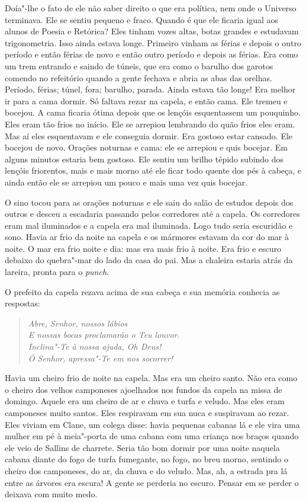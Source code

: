 Doía"-lhe o fato de ele não saber direito o que era política, nem onde o
Universo terminava. Ele se sentiu pequeno e fraco. Quando é que ele
ficaria igual aos alunos de Poesia e Retórica? Eles tinham vozes altas,
botas grandes e estudavam trigonometria. Isso ainda estava longe.
Primeiro vinham as férias e depois o outro período e então férias de
novo e então outro período e depois as férias. Era como um trem
entrando e saindo de túneis, que era como o barulho dos garotos comendo
no refeitório quando a gente fechava e abria as abas das orelhas.
Período, férias; túnel, fora; barulho, parada. Ainda estava tão longe!
Era melhor ir para a cama dormir. Só faltava rezar na capela, e então
cama. Ele tremeu e bocejou. A cama ficaria ótima depois que os lençóis
esquentassem um pouquinho. Eles eram tão frios no início. Ele se
arrepiou lembrando do quão frios eles eram. Mas aí eles esquentavam e
ele conseguia dormir. Era gostoso estar cansado. Ele bocejou de novo.
Orações noturnas e cama: ele se arrepiou e quis bocejar. Em alguns
minutos estaria bem gostoso. Ele sentiu um brilho tépido subindo dos
lençóis friorentos, mais e mais morno até ele ficar todo quente dos
pés à cabeça, e ainda então ele se arrepiou um pouco e mais uma vez
quis bocejar.

O sino tocou para as orações noturnas e ele saiu do salão de estudos
depois dos outros e desceu a escadaria passando pelos corredores até a
capela. Os corredores eram mal iluminados e a capela era mal iluminada.
Logo tudo seria escuridão e sono. Havia ar frio da noite na capela e os
mármores estavam da cor do mar à noite. O mar era frio noite e dia: mas
era mais frio à noite. Era frio e escuro debaixo do quebra"-mar do lado
da casa do pai. Mas a chaleira estaria atrás da lareira, pronta para o
\textit{punch}.                                                        

O prefeito da capela rezava acima de sua cabeça e sua memória conhecia
as respostas:

\begin{verse}\itshape
Abre, Senhor, nossos lábios\\
E nossas bocas proclamarão o Teu louvor.\\
Inclina"-Te à nossa ajuda, Oh Deus!\\
Ó Senhor, apressa"-Te em nos socorrer!
\end{verse}

Havia um cheiro frio de noite na capela. Mas era um cheiro santo. Não
era como o cheiro dos velhos camponeses ajoelhados nos fundos da capela
na missa de domingo. Aquele era um cheiro de ar e chuva e turfa e
veludo. Mas eles eram camponeses muito santos. Eles respiravam em sua
nuca e suspiravam ao rezar. Eles viviam em Clane, um colega disse:
havia pequenas cabanas lá e ele vira uma mulher em pé à meia"-porta de
uma cabana com uma criança nos braços quando ele veio de Sallins de
charrete. Seria tão bom dormir por uma noite naquela cabana diante do
fogo de turfa fumegante, no fogo, no breu morno, sentindo o cheiro dos
camponeses, do ar, da chuva e do veludo. Mas, ah, a estrada pra lá
entre as árvores era escura! A gente se perderia no escuro. Pensar em
se perder o deixava com muito medo.

